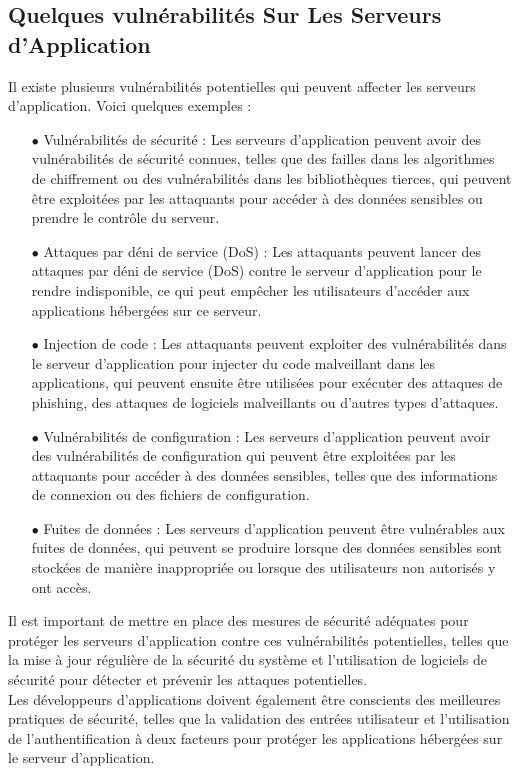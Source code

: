 \subsection{Quelques vulnérabilités Sur Les Serveurs d'Application }
Il existe plusieurs vulnérabilités potentielles qui peuvent affecter les serveurs d'application. Voici quelques exemples :
\begin{enumerate}
\item[$\bullet$]  Vulnérabilités de sécurité : Les serveurs d'application peuvent avoir des vulnérabilités de sécurité connues, telles que des failles dans les algorithmes de chiffrement ou des vulnérabilités dans les bibliothèques tierces, qui peuvent être exploitées par les attaquants pour accéder à des données sensibles ou prendre le contrôle du serveur.

\item[$\bullet$]  Attaques par déni de service (DoS) : Les attaquants peuvent lancer des attaques par déni de service (DoS) contre le serveur d'application pour le rendre indisponible, ce qui peut empêcher les utilisateurs d'accéder aux applications hébergées sur ce serveur.

\item[$\bullet$]  Injection de code : Les attaquants peuvent exploiter des vulnérabilités dans le serveur d'application pour injecter du code malveillant dans les applications, qui peuvent ensuite être utilisées pour exécuter des attaques de phishing, des attaques de logiciels malveillants ou d'autres types d'attaques.

\item[$\bullet$] Vulnérabilités de configuration : Les serveurs d'application peuvent avoir des vulnérabilités de configuration qui peuvent être exploitées par les attaquants pour accéder à des données sensibles, telles que des informations de connexion ou des fichiers de configuration.

\item[$\bullet$]  Fuites de données : Les serveurs d'application peuvent être vulnérables aux fuites de données, qui peuvent se produire lorsque des données sensibles sont stockées de manière inappropriée ou lorsque des utilisateurs non autorisés y ont accès.
\end{enumerate}
Il est important de mettre en place des mesures de sécurité adéquates pour protéger les serveurs d'application contre ces vulnérabilités potentielles, telles que la mise à jour régulière de la sécurité du système et l'utilisation de logiciels de sécurité pour détecter et prévenir les attaques potentielles.\\
 Les développeurs d'applications doivent également être conscients des meilleures pratiques de sécurité, telles que la validation des entrées utilisateur et l'utilisation de l'authentification à deux facteurs pour protéger les applications hébergées sur le serveur d'application.\\
 
